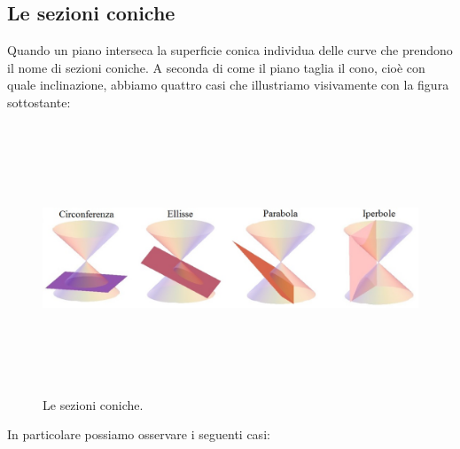 \subsection{Le sezioni coniche}  

Quando un piano interseca la superficie conica individua delle 
curve che prendono il nome di sezioni coniche. A seconda di come il piano 
taglia il cono, cioè con quale inclinazione, abbiamo quattro casi che 
illustriamo visivamente con la figura sottostante:  
  
\begin{figure}[htbp]
  \begin{inaccessibleblock}
\centering%
\includegraphics[height=8cm, width=13cm, keepaspectratio] {img/coniche.jpg}%
\caption{Le sezioni coniche.}%
\label{fig:coniche}
  \end{inaccessibleblock}  
\end{figure}

In particolare possiamo osservare i seguenti casi:

